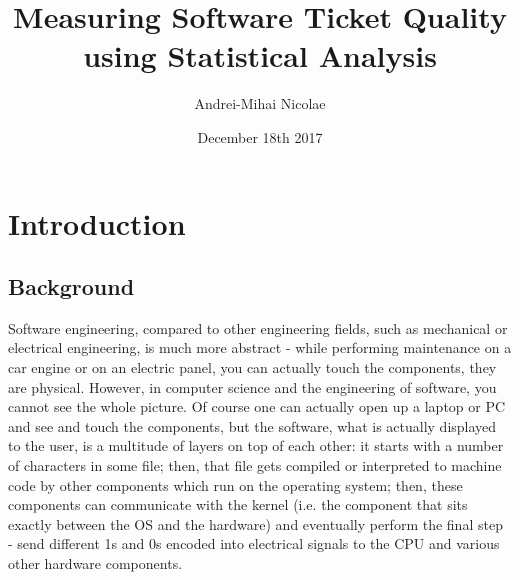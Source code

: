 \documentclass{mprop}
\begin{document}
\title{Measuring Software Ticket Quality using Statistical Analysis}
\author{Andrei-Mihai Nicolae}
\date{December 18th 2017}
\maketitle

\tableofcontents
\newpage


\section{Introduction}\label{intro}

\subsection{Background}

Software engineering, compared to other engineering fields, such as
mechanical or electrical engineering, is much more abstract - while 
performing maintenance on a car engine or on an electric panel,
you can actually touch the components, they are physical. However, in
computer science and the engineering of software, you cannot see the whole picture.
Of course one can actually open up a laptop or PC and see and touch the
components, but the software, what is actually displayed to the user, 
is a multitude of layers on top of each other: it starts with a number of characters in some file;
then, that file gets compiled or interpreted to machine
code by other components which run on the operating system; then, these components
can communicate with the kernel (i.e. the component that sits exactly
between the OS and the hardware) and eventually perform the final step - send 
different 1s and 0s encoded into electrical signals to the CPU and various
other hardware components.
\end{document}
